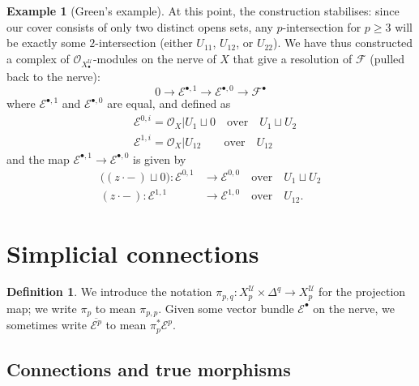 \documentclass[11pt,fleqn]{article}
\theoremstyle{plain}
\theoremstyle{definition}
\newtheorem{definition}[theorem]{Definition}
\newtheorem{example}[theorem]{Example}
\theoremstyle{remark}
\numberwithin{equation}{theorem}
\newcommand{\cover}{\mathcal{U}}
\newcommand{\OO}{\mathcal{O}}
\newcommand{\restricted}{\mathbin{\big\vert}}
\newcommand{\nerve}[1]{X_{#1}^\cover}
\begin{document}
\begin{example}[Green's example]
            At this point, the construction stabilises: since our cover consists of only two distinct opens sets, any $p$-intersection for $p\geqslant3$ will be exactly some $2$-intersection (either $U_{11}$, $U_{12}$, or $U_{22}$).
            We have thus constructed a complex of $\OO_{\nerve{\bullet}}$-modules on the nerve of $X$ that give a resolution of $\mathscr{F}$ (pulled back to the nerve):
            \begin{equation*}
                0\to\mathcal{E}^{\bullet,1}\to\mathcal{E}^{\bullet,0}\to\mathscr{F}^\bullet
            \end{equation*}
            where $\mathcal{E}^{\bullet,1}$ and $\mathcal{E}^{\bullet,0}$ are equal, and defined as
            \begin{align*}
                &\mathcal{E}^{0,i}=\OO_X\restricted {U_1}\sqcup0 \quad \text{over}\quad U_1\sqcup U_2\\
                &\mathcal{E}^{1,i}=\OO_X\restricted {U_{12}} \qquad \text{over}\quad U_{12}
            \end{align*}
            and the map $\mathcal{E}^{\bullet,1}\to\mathcal{E}^{\bullet,0}$ is given by
            \begin{align*}
                \big((z\cdot-\,)\sqcup0\big) \colon \mathcal{E}^{0,1}&\to\mathcal{E}^{0,0} \quad\text{over}\quad U_1\sqcup U_2\\
                (z\cdot-\,) \colon \mathcal{E}^{1,1}&\to\mathcal{E}^{1,0} \quad\text{over}\quad U_{12}.
            \end{align*}
        \end{example}



\section{Simplicial connections}\label{section:simplicial-connections}

    \begin{definition}
        We introduce the notation $\pi_{p,q}\colon\nerve{p}\times\Delta^q\to\nerve{p}$ for the projection map; we write $\pi_p$ to mean $\pi_{p,p}$.
        Given some vector bundle $\mathcal{E}^\bullet$ on the nerve, we sometimes write $\overline{\mathcal{E}^p}$ to mean $\pi_p^*\mathcal{E}^p$.
    \end{definition}

    \subsection{Connections and true morphisms}
\end{document}
